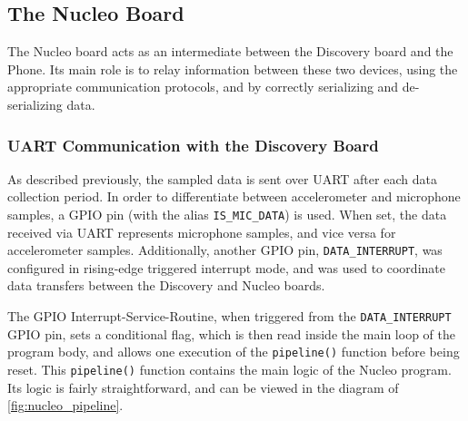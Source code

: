 \subsection{The Nucleo Board}
The Nucleo board acts as an intermediate between the Discovery board and the Phone. Its main role is to relay information between these two devices, using the appropriate communication protocols, and by correctly serializing and de-serializing data.

\subsubsection{UART Communication with the Discovery Board}
As described previously, the sampled data is sent over UART after each data collection period. In order to differentiate between accelerometer and microphone samples, a GPIO pin (with the alias \verb|IS_MIC_DATA|) is used. When set, the data received via UART represents microphone samples, and vice versa for accelerometer samples. Additionally, another GPIO pin, \verb|DATA_INTERRUPT|, was configured in rising-edge triggered interrupt mode, and was used to coordinate data transfers between the Discovery and Nucleo boards.

The GPIO Interrupt-Service-Routine, when triggered from the \verb|DATA_INTERRUPT| GPIO pin, sets a conditional flag, which is then read inside the main loop of the program body, and allows one execution of the \verb|pipeline()| function before being reset. This \verb|pipeline()| function contains the main logic of the Nucleo program. Its logic is fairly straightforward, and can be viewed in the diagram of \autoref{fig:nucleo_pipeline}.

